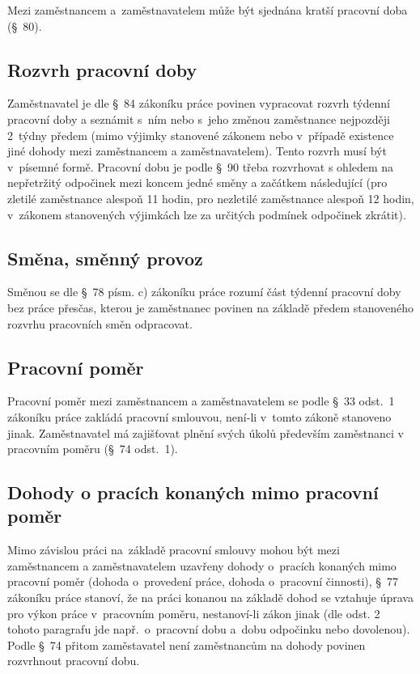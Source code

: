 \documentclass[a4paper,11pt,openany,twoside]{book}
\begin{document}
Mezi zaměstnancem a~zaměstnavatelem může být sjednána kratší pracovní doba (§~80).

\subsection{Rozvrh pracovní doby}
Zaměstnavatel je dle §~84 zákoníku práce povinen vypracovat rozvrh týdenní pracovní doby a seznámit s~ním nebo s~jeho změnou zaměstnance nejpozději 2~týdny předem (mimo výjimky stanovené zákonem nebo v~případě existence jiné dohody mezi zaměstnancem a zaměstnavatelem). Tento rozvrh musí být v~písemné formě. Pracovní dobu je podle §~90 třeba rozvrhovat s ohledem na nepřetržitý odpočinek mezi koncem jedné směny a začátkem následující (pro zletilé zaměstnance alespoň 11 hodin, pro nezletilé zaměstnance alespoň 12 hodin, v~zákonem stanovených výjimkách lze za určitých podmínek odpočinek zkrátit).

\subsection{Směna, směnný provoz}
Směnou se dle §~78 písm. c) zákoníku práce rozumí část týdenní pracovní doby bez práce přesčas, kterou je zaměstnanec povinen na základě předem stanoveného rozvrhu pracovních směn odpracovat.

\subsection{Pracovní poměr}
Pracovní poměr mezi zaměstnancem a zaměstnavatelem se podle §~33 odst.~1 zákoníku práce zakládá pracovní smlouvou, není-li v~tomto zákoně stanoveno jinak. Zaměstnavatel má zajišťovat plnění svých úkolů především zaměstnanci v pracovním poměru (§~74 odst.~1).

\subsection{Dohody o pracích konaných mimo pracovní poměr}
Mimo závislou práci na~základě pracovní smlouvy mohou být mezi zaměstnancem a zaměstnavatelem uzavřeny dohody o~pracích konaných mimo pracovní poměr (dohoda o~provedení práce, dohoda o~pracovní činnosti), §~77 zákoníku práce stanoví, že na práci konanou na základě dohod se vztahuje úprava pro výkon práce v~pracovním poměru, nestanoví-li zákon jinak (dle odst. 2 tohoto paragrafu jde např.~o~pracovní dobu a~dobu odpočinku nebo dovolenou). Podle §~74 přitom zaměstavatel není zaměstnancům na dohody povinen rozvrhnout pracovní dobu.
\end{document}
